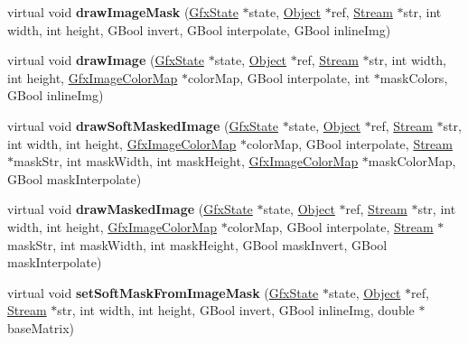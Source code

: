 \begin{DoxyCompactItemize}
virtual void {\bfseries draw\+Image\+Mask} (\hyperlink{class_gfx_state}{Gfx\+State} $\ast$state, \hyperlink{class_object}{Object} $\ast$ref, \hyperlink{class_stream}{Stream} $\ast$str, int width, int height, G\+Bool invert, G\+Bool interpolate, G\+Bool inline\+Img)
\item 
\mbox{\label{class_cairo_image_output_dev_a4bc8120030c80a6aef5614b04683e5d9}} 
virtual void {\bfseries draw\+Image} (\hyperlink{class_gfx_state}{Gfx\+State} $\ast$state, \hyperlink{class_object}{Object} $\ast$ref, \hyperlink{class_stream}{Stream} $\ast$str, int width, int height, \hyperlink{class_gfx_image_color_map}{Gfx\+Image\+Color\+Map} $\ast$color\+Map, G\+Bool interpolate, int $\ast$mask\+Colors, G\+Bool inline\+Img)
\item 
\mbox{\label{class_cairo_image_output_dev_a8c8dcfff2e85cb34bfcf2aca835a095f}} 
virtual void {\bfseries draw\+Soft\+Masked\+Image} (\hyperlink{class_gfx_state}{Gfx\+State} $\ast$state, \hyperlink{class_object}{Object} $\ast$ref, \hyperlink{class_stream}{Stream} $\ast$str, int width, int height, \hyperlink{class_gfx_image_color_map}{Gfx\+Image\+Color\+Map} $\ast$color\+Map, G\+Bool interpolate, \hyperlink{class_stream}{Stream} $\ast$mask\+Str, int mask\+Width, int mask\+Height, \hyperlink{class_gfx_image_color_map}{Gfx\+Image\+Color\+Map} $\ast$mask\+Color\+Map, G\+Bool mask\+Interpolate)
\item 
\mbox{\label{class_cairo_image_output_dev_a84decc0794b11aad02ab190d48605427}} 
virtual void {\bfseries draw\+Masked\+Image} (\hyperlink{class_gfx_state}{Gfx\+State} $\ast$state, \hyperlink{class_object}{Object} $\ast$ref, \hyperlink{class_stream}{Stream} $\ast$str, int width, int height, \hyperlink{class_gfx_image_color_map}{Gfx\+Image\+Color\+Map} $\ast$color\+Map, G\+Bool interpolate, \hyperlink{class_stream}{Stream} $\ast$mask\+Str, int mask\+Width, int mask\+Height, G\+Bool mask\+Invert, G\+Bool mask\+Interpolate)
\item 
\mbox{\label{class_cairo_image_output_dev_a78157484bbbd691208f6825fa8a98b4a}} 
virtual void {\bfseries set\+Soft\+Mask\+From\+Image\+Mask} (\hyperlink{class_gfx_state}{Gfx\+State} $\ast$state, \hyperlink{class_object}{Object} $\ast$ref, \hyperlink{class_stream}{Stream} $\ast$str, int width, int height, G\+Bool invert, G\+Bool inline\+Img, double $\ast$base\+Matrix)

\end{DoxyCompactItemize}
